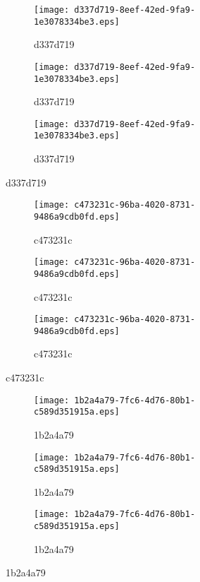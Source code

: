 \documentclass[letterpaper,11pt]{article}
\begin{document}
    \begin{figure}
        
        \begin{subfigure}{.3\textwidth}
            \texttt{[image: d337d719-8eef-42ed-9fa9-1e3078334be3.eps]}
            \caption{d337d719}
        \end{subfigure} 
        \begin{subfigure}{.3\textwidth}
            \texttt{[image: d337d719-8eef-42ed-9fa9-1e3078334be3.eps]}
            \caption{d337d719}
        \end{subfigure} 
        \begin{subfigure}{.3\textwidth}
            \texttt{[image: d337d719-8eef-42ed-9fa9-1e3078334be3.eps]}
            \caption{d337d719}
        \end{subfigure} 
    \end{figure}


    \begin{figure}
        
        \begin{subfigure}{.3\textwidth}
            \texttt{[image: c473231c-96ba-4020-8731-9486a9cdb0fd.eps]}
            \caption{c473231c}
        \end{subfigure} 
        \begin{subfigure}{.3\textwidth}
            \texttt{[image: c473231c-96ba-4020-8731-9486a9cdb0fd.eps]}
            \caption{c473231c}
        \end{subfigure} 
        \begin{subfigure}{.3\textwidth}
            \texttt{[image: c473231c-96ba-4020-8731-9486a9cdb0fd.eps]}
            \caption{c473231c}
        \end{subfigure} 
    \end{figure}


    \begin{figure}
        
        \begin{subfigure}{.3\textwidth}
            \texttt{[image: 1b2a4a79-7fc6-4d76-80b1-c589d351915a.eps]}
            \caption{1b2a4a79}
        \end{subfigure} 
        \begin{subfigure}{.3\textwidth}
            \texttt{[image: 1b2a4a79-7fc6-4d76-80b1-c589d351915a.eps]}
            \caption{1b2a4a79}
        \end{subfigure} 
        \begin{subfigure}{.3\textwidth}
            \texttt{[image: 1b2a4a79-7fc6-4d76-80b1-c589d351915a.eps]}
            \caption{1b2a4a79}
        \end{subfigure} 
    \end{figure}
\end{document}
